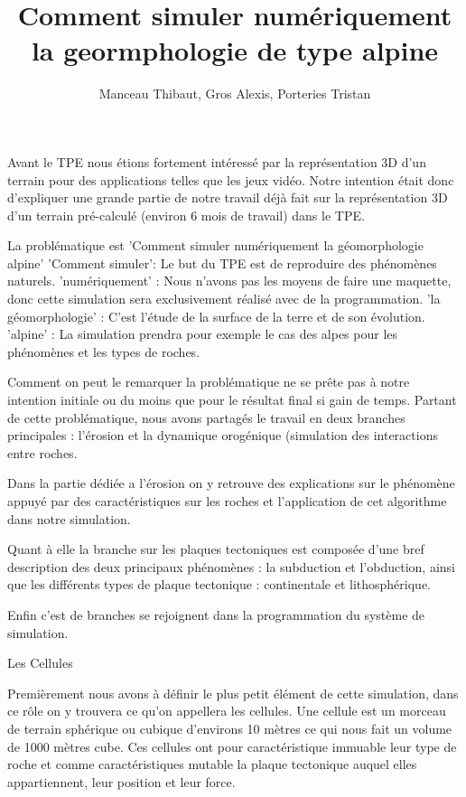 \documentclass[a4paper,10pt]{article}
\title{Comment simuler numériquement la geormphologie de type alpine}
\author{Manceau Thibaut, Gros Alexis, Porteries Tristan}
\begin{document}
\maketitle

\begin{abstract}

\end{abstract}


Avant le TPE nous étions fortement intéressé par la représentation 3D d'un terrain pour des applications telles que les jeux vidéo. Notre intention était donc d'expliquer une grande partie de notre travail déjà fait sur la représentation 3D d'un terrain pré-calculé (environ 6 mois de travail) dans le TPE.

La problématique est 'Comment simuler numériquement la géomorphologie alpine'
'Comment simuler': Le but du TPE est de reproduire des phénomènes naturels.
'numériquement' : Nous n'avons pas les moyens de faire une maquette, donc cette simulation sera  exclusivement réalisé avec de la programmation.
'la géomorphologie' : C'est l'étude de la surface de la terre et de son évolution.
'alpine' : La simulation prendra pour exemple le cas des alpes pour les phénomènes et les types de roches.

Comment on peut le remarquer la problématique ne se prête pas à notre intention initiale ou du moins que pour le résultat final si gain de temps. Partant de cette problématique, nous avons partagés le travail en deux branches principales : l'érosion et la dynamique orogénique (simulation des interactions entre roches.

Dans la partie dédiée a l'érosion on y retrouve des explications sur le phénomène appuyé par des caractéristiques sur les roches et l'application de cet algorithme dans notre simulation.

Quant à elle la branche sur les plaques tectoniques est composée d'une bref description des deux principaux phénomènes : la subduction et l'obduction, ainsi que les différents types de plaque tectonique : continentale et lithosphérique.

Enfin c'est de branches se rejoignent dans la programmation du système de simulation.

Les Cellules

Premièrement nous avons à définir le plus petit élément de cette simulation, dans ce rôle on y trouvera ce qu'on appellera les cellules. Une cellule est un morceau de terrain sphérique ou cubique  d'environs 10 mètres ce qui nous fait un volume de 1000 mètres cube. Ces cellules ont pour caractéristique immuable leur type de roche et comme caractéristiques mutable la plaque tectonique auquel elles appartiennent, leur position et leur force.
\end{document}
